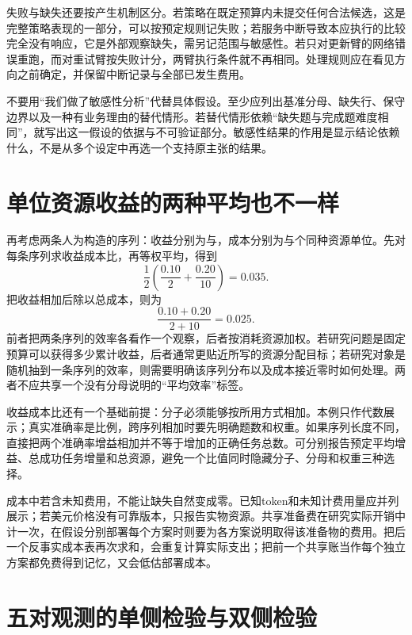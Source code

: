 失败与缺失还要按产生机制区分。若策略在既定预算内未提交任何合法候选，这是完整策略表现的一部分，可以按预定规则记失败；若服务中断导致本应执行的比较完全没有响应，它是外部观察缺失，需另记范围与敏感性。若只对更新臂的网络错误重跑，而对重试臂按失败计分，两臂执行条件就不再相同。处理规则应在看见方向之前确定，并保留中断记录与全部已发生费用。

不要用“我们做了敏感性分析”代替具体假设。至少应列出基准分母、缺失行、保守边界以及一种有业务理由的替代情形。若替代情形依赖“缺失题与完成题难度相同”，就写出这一假设的依据与不可验证部分。敏感性结果的作用是显示结论依赖什么，不是从多个设定中再选一个支持原主张的结果。

\section{单位资源收益的两种平均也不一样}

再考虑两条人为构造的序列：收益分别为与，成本分别为与个同种资源单位。先对每条序列求收益成本比，再等权平均，得到
\begin{equation}
 \frac12\left(\frac{0.10}{2}+\frac{0.20}{10}\right)=0.035.
\end{equation}
把收益相加后除以总成本，则为
\begin{equation}
 \frac{0.10+0.20}{2+10}=0.025.
\end{equation}
前者把两条序列的效率各看作一个观察，后者按消耗资源加权。若研究问题是固定预算可以获得多少累计收益，后者通常更贴近所写的资源分配目标；若研究对象是随机抽到一条序列的效率，则需要明确该序列分布以及成本接近零时如何处理。两者不应共享一个没有分母说明的“平均效率”标签。

收益成本比还有一个基础前提：分子必须能够按所用方式相加。本例只作代数展示；真实准确率是比例，跨序列相加时要先明确题数和权重。如果序列长度不同，直接把两个准确率增益相加并不等于增加的正确任务总数。可分别报告预定平均增益、总成功任务增量和总资源，避免一个比值同时隐藏分子、分母和权重三种选择。

成本中若含未知费用，不能让缺失自然变成零。已知token和未知计费用量应并列展示；若美元价格没有可靠版本，只报告实物资源。共享准备费在研究实际开销中计一次，在假设分别部署每个方案时则要为各方案说明取得该准备物的费用。把后一个反事实成本表再次求和，会重复计算实际支出；把前一个共享账当作每个独立方案都免费得到记忆，又会低估部署成本。

\section{五对观测的单侧检验与双侧检验}
\label{sec:appa-signed-rank}

